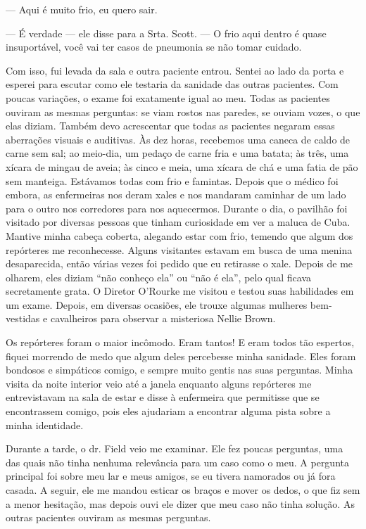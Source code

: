 --- Aqui é muito frio, eu quero sair.

--- É verdade --- ele disse para a Srta. Scott. --- O frio aqui dentro é
quase insuportável, você vai ter casos de pneumonia se não tomar
cuidado.

Com isso, fui levada da sala e outra paciente entrou. Sentei ao lado da
porta e esperei para escutar como ele testaria da sanidade das outras
pacientes. Com poucas variações, o exame foi exatamente igual ao meu.
Todas as pacientes ouviram as mesmas perguntas: se viam rostos nas
paredes, se ouviam vozes, o que elas diziam. Também devo acrescentar que
todas as pacientes negaram essas aberrações visuais e auditivas. Às dez
horas, recebemos uma caneca de caldo de carne sem sal; ao meio-dia, um
pedaço de carne fria e uma batata; às três, uma xícara de mingau de
aveia; às cinco e meia, uma xícara de chá e uma fatia de pão sem
manteiga. Estávamos todas com frio e famintas. Depois que o médico foi
embora, as enfermeiras nos deram xales e nos mandaram caminhar de um
lado para o outro nos corredores para nos aquecermos. Durante o dia, o
pavilhão foi visitado por diversas pessoas que tinham curiosidade em ver
a maluca de Cuba. Mantive minha cabeça coberta, alegando estar com frio,
temendo que algum dos repórteres me reconhecesse. Alguns visitantes
estavam em busca de uma menina desaparecida, então várias vezes foi
pedido que eu retirasse o xale. Depois de me olharem, eles diziam ``não
conheço ela'' ou ``não é ela'', pelo qual ficava secretamente grata. O
Diretor O'Rourke me visitou e testou suas habilidades em um exame.
Depois, em diversas ocasiões, ele trouxe algumas mulheres bem-vestidas e
cavalheiros para observar a misteriosa Nellie Brown.

Os repórteres foram o maior incômodo. Eram tantos! E eram todos tão
espertos, fiquei morrendo de medo que algum deles percebesse minha
sanidade. Eles foram bondosos e simpáticos comigo, e sempre muito gentis
nas suas perguntas. Minha visita da noite interior veio até a janela
enquanto alguns repórteres me entrevistavam na sala de estar e disse à
enfermeira que permitisse que se encontrassem comigo, pois eles
ajudariam a encontrar alguma pista sobre a minha identidade.

Durante a tarde, o dr. Field veio me examinar. Ele fez poucas perguntas,
uma das quais não tinha nenhuma relevância para um caso como o meu. A
pergunta principal foi sobre meu lar e meus amigos, se eu tivera
namorados ou já fora casada. A seguir, ele me mandou esticar os braços e
mover os dedos, o que fiz sem a menor hesitação, mas depois ouvi ele
dizer que meu caso não tinha solução. As outras pacientes ouviram as
mesmas perguntas.

